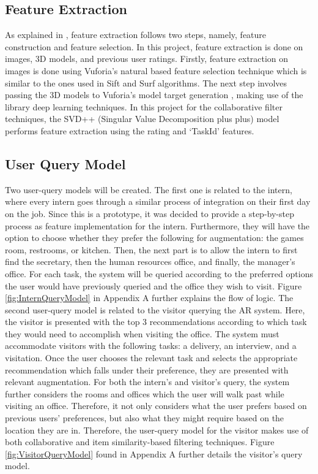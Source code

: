\documentclass{aifyp}
\begin{document}
\subsection{Feature Extraction}
\indent As explained in \cite{IntroToFeatureExtraction}, feature extraction follows two steps, namely, feature construction and feature selection. In this project, feature extraction is done on images, 3D models, and previous user ratings. Firstly, feature extraction on images is done using Vuforia’s natural based feature selection technique \cite{optimizingtargetdetectionandtrackingstability} which is similar to the ones used in Sift \cite{SIFT} and Surf \cite{SURF} algorithms. The next step involves passing the 3D models to Vuforia’s model target generation \cite{modeltargetgeneratoruserguide}, making use of the library deep learning techniques. In this project for the collaborative filter techniques, the SVD++ (Singular Value Decomposition plus plus) model performs feature extraction using the rating and `TaskId' features.
\subsection{User Query Model}
\indent Two user-query models will be created. The first one is related to the intern, where every intern goes through a similar process of integration on their first day on the job. Since this is a prototype, it was decided to provide a step-by-step process as feature implementation for the intern. Furthermore, they will have the option to choose whether they prefer the following for augmentation: the games room, restrooms, or kitchen. Then, the next part is to allow the intern to first find the secretary, then the human resources office, and finally, the manager’s office. For each task, the system will be queried according to the preferred options the user would have previously queried and the office they wish to visit. Figure \ref{fig:InternQueryModel} in Appendix A further explains the flow of logic.
\newline
\newline
\indent The second user-query model is related to the visitor querying the AR system. Here, the visitor is presented with the top 3 recommendations according to which task they would need to accomplish when visiting the office. The system must accommodate visitors with the following tasks: a delivery, an interview, and a visitation. Once the user chooses the relevant task and selects the appropriate recommendation which falls under their preference, they are presented with relevant augmentation. For both the intern’s and visitor’s query, the system further considers the rooms and offices which the user will walk past while visiting an office. Therefore, it not only considers what the user prefers based on previous users’ preferences, but also what they might require based on the location they are in. Therefore, the user-query model for the visitor makes use of both collaborative and item similarity-based filtering techniques. Figure \ref{fig:VisitorQueryModel} found in Appendix A further details the visitor's query model.
\end{document}
